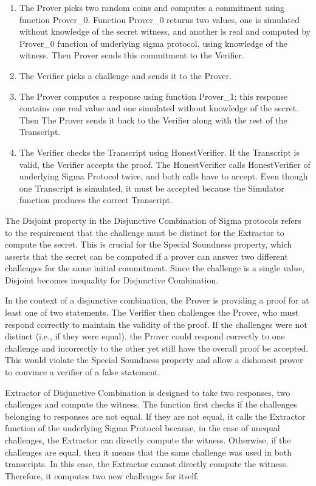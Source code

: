 \begin{enumerate}
\item The Prover picks two random coins and computes a commitment using function Prover\_0. 
Function Prover\_0 returns two values, one is simulated without knowledge of the secret witness, and another is real and computed by 
Prover\_0 function of underlying sigma protocol, using knowledge of the witness. Then Prover sends this commitment to the Verifier.
\item The Verifier picks a challenge and sends it to the Prover. 
\item The Prover computes a response using function Prover\_1; this response contains one real value and one simulated without knowledge of the secret. 
Then The Prover sends it back to the Verifier along with the rest of the Transcript.
\item The Verifier checks the Transcript using HonestVerifier. If the Transcript is valid, the Verifier accepts the proof. The HonestVerifier calls 
HonestVerifier of underlying Sigma Protocol twice, and both calls have to accept. Even though one Transcript is simulated, it must be accepted because 
the Simulator function produces the correct Transcript. 
\end{enumerate}
The Disjoint property in the Disjunctive Combination of Sigma protocols refers to the requirement that the challenge must be distinct for the 
Extractor to compute the secret. This is crucial for the Special Soundness property, which asserts that the secret can be computed if a prover 
can answer two different challenges for the same initial commitment.
Since the challenge is a single value, Disjoint becomes inequality for Disjunctive Combination.

In the context of a disjunctive combination, the Prover is providing a proof for at least one of two statements. The Verifier then challenges the 
Prover, who must respond correctly to maintain the validity of the proof. If the challenges were not distinct (i.e., if they were equal), the 
Prover could respond correctly to one challenge and incorrectly to the other yet still have the overall proof be accepted. This would violate the 
Special Soundness property and allow a dishonest prover to convince a verifier of a false statement.

Extractor of Disjunctive Combination is designed to take two responses, two challenges and compute the witness. 
The function first checks if the challenges belonging to responses are not equal. If they are not equal, it calls the Extractor function of the 
underlying Sigma Protocol because, in the case of unequal challenges, the Extractor can directly compute the witness. Otherwise, if the challenges 
are equal, then it means that the same challenge was used in both transcripts. In this case, the Extractor cannot directly compute the witness. 
Therefore, it computes two new challenges for itself. 

